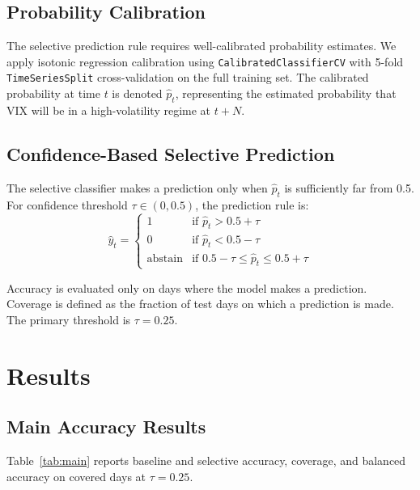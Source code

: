 \documentclass[12pt]{article}
\begin{document}
\subsection{Probability Calibration}

The selective prediction rule requires well-calibrated probability estimates. We apply isotonic
regression calibration using \texttt{CalibratedClassifierCV} with 5-fold
\texttt{TimeSeriesSplit} cross-validation on the full training set. The calibrated probability
at time $t$ is denoted $\hat{p}_t$, representing the estimated probability that VIX will be in a
high-volatility regime at $t + N$.

\subsection{Confidence-Based Selective Prediction}

The selective classifier makes a prediction only when $\hat{p}_t$ is sufficiently far from 0.5.
For confidence threshold $\tau \in (0, 0.5)$, the prediction rule is:
\begin{equation}
    \hat{y}_t = \begin{cases}
        1 & \text{if } \hat{p}_t > 0.5 + \tau \\
        0 & \text{if } \hat{p}_t < 0.5 - \tau \\
        \text{abstain} & \text{if } 0.5 - \tau \leq \hat{p}_t \leq 0.5 + \tau
    \end{cases}
    \label{eq:selective}
\end{equation}

Accuracy is evaluated only on days where the model makes a prediction. Coverage is defined as
the fraction of test days on which a prediction is made. The primary threshold is $\tau = 0.25$.

\section{Results}
\label{sec:results}

\subsection{Main Accuracy Results}
\label{sec:main}

Table~\ref{tab:main} reports baseline and selective accuracy, coverage, and balanced accuracy
on covered days at $\tau = 0.25$.
\end{document}
